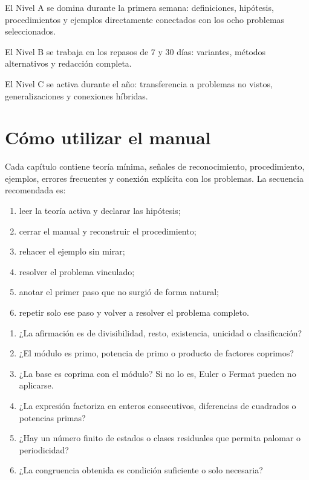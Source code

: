 \documentclass[11pt,a4paper,openany]{book}
\begin{document}
\begin{nivelA}
El Nivel A se domina durante la primera semana: definiciones, hipótesis, procedimientos y ejemplos directamente conectados con los ocho problemas seleccionados.
\end{nivelA}
\begin{nivelB}
El Nivel B se trabaja en los repasos de 7 y 30 días: variantes, métodos alternativos y redacción completa.
\end{nivelB}
\begin{nivelC}
El Nivel C se activa durante el año: transferencia a problemas no vistos, generalizaciones y conexiones híbridas.
\end{nivelC}

\chapter*{Cómo utilizar el manual}
Cada capítulo contiene teoría mínima, señales de reconocimiento, procedimiento, ejemplos, errores frecuentes y conexión explícita con los problemas. La secuencia recomendada es:
\begin{enumerate}
\item leer la teoría activa y declarar las hipótesis;
\item cerrar el manual y reconstruir el procedimiento;
\item rehacer el ejemplo sin mirar;
\item resolver el problema vinculado;
\item anotar el primer paso que no surgió de forma natural;
\item repetir solo ese paso y volver a resolver el problema completo.
\end{enumerate}

\begin{ruta}
\begin{enumerate}
\item ¿La afirmación es de divisibilidad, resto, existencia, unicidad o clasificación?
\item ¿El módulo es primo, potencia de primo o producto de factores coprimos?
\item ¿La base es coprima con el módulo? Si no lo es, Euler o Fermat pueden no aplicarse.
\item ¿La expresión factoriza en enteros consecutivos, diferencias de cuadrados o potencias primas?
\item ¿Hay un número finito de estados o clases residuales que permita palomar o periodicidad?
\item ¿La congruencia obtenida es condición suficiente o solo necesaria?
\end{enumerate}
\end{ruta}
\end{document}
